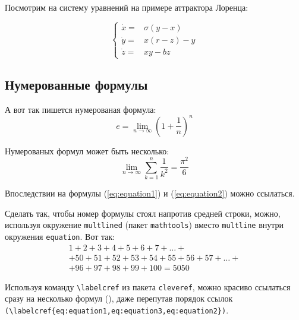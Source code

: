 Посмотрим на систему уравнений на примере аттрактора Лоренца:

\[ 
\left\{
  \begin{array}{rl}
    \dot x = & \sigma (y-x) \\
    \dot y = & x (r - z) - y \\
    \dot z = & xy - bz
  \end{array}
\right.
\]


\subsection{Нумерованные формулы} \label{subsect1_3_3}

А вот так пишется нумерованая формула:
\begin{equation}
  \label{eq:equation1}
  e = \lim_{n \to \infty} \left( 1+\frac{1}{n} \right) ^n
\end{equation}

Нумерованых формул может быть несколько:
\begin{equation}
  \label{eq:equation2}
  \lim_{n \to \infty} \sum_{k=1}^n \frac{1}{k^2} = \frac{\pi^2}{6}
\end{equation}

Впоследствии на формулы (\ref{eq:equation1}) и (\ref{eq:equation2}) можно ссылаться.

Сделать так, чтобы номер формулы стоял напротив средней строки, можно, используя окружение \verb|multlined| (пакет \verb|mathtools|) вместо \verb|multline| внутри окружения \verb|equation|. Вот так:
\begin{equation} %
  \label{eq:equation3}
    \begin{multlined}
        1+ 2+3+4+5+6+7+\dots + \\ 
        + 50+51+52+53+54+55+56+57 + \dots + \\ 
        + 96+97+98+99+100=5050 
    \end{multlined}
\end{equation}

Используя команду \verb|\labelcref| из пакета \verb|cleveref|, можно
красиво ссылаться сразу на несколько формул
(), даже перепутав
порядок ссылок \verb|(\labelcref{eq:equation1,eq:equation3,eq:equation2})|.

